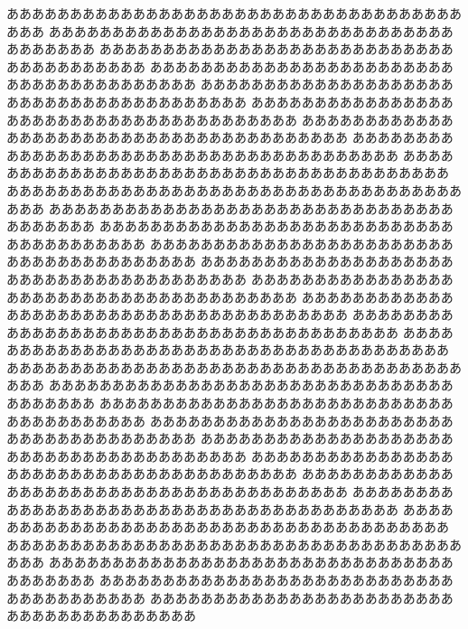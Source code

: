 \documentclass{ttisummary}
\begin{document}
あああああああああああああああああああああああああああああああああああああああ
あああああああああああああああああああああああああああああああああああああああ
あああああああああああああああああああああああああああああああああああああああ
あああああああああああああああああああああああああああああああああああああああ
あああああああああああああああああああああああああああああああああああああああ
あああああああああああああああああああああああああああああああああああああああ
あああああああああああああああああああああああああああああああああああああああ
あああああああああああああああああああああああああああああああああああああああ
あああああああああああああああああああああああああああああああああああああああ
あああああああああああああああああああああああああああああああああああああああ
あああああああああああああああああああああああああああああああああああああああ
あああああああああああああああああああああああああああああああああああああああ
あああああああああああああああああああああああああああああああああああああああ
あああああああああああああああああああああああああああああああああああああああ
あああああああああああああああああああああああああああああああああああああああ
あああああああああああああああああああああああああああああああああああああああ
あああああああああああああああああああああああああああああああああああああああ
あああああああああああああああああああああああああああああああああああああああ
あああああああああああああああああああああああああああああああああああああああ
あああああああああああああああああああああああああああああああああああああああ
あああああああああああああああああああああああああああああああああああああああ
あああああああああああああああああああああああああああああああああああああああ
あああああああああああああああああああああああああああああああああああああああ
あああああああああああああああああああああああああああああああああああああああ
あああああああああああああああああああああああああああああああああああああああ
あああああああああああああああああああああああああああああああああああああああ
あああああああああああああああああああああああああああああああああああああああ
あああああああああああああああああああああああああああああああああああああああ
あああああああああああああああああああああああああああああああああああああああ
あああああああああああああああああああああああああああああああああああああああ
あああああああああああああああああああああああああああああああああああああああ
\end{document}

